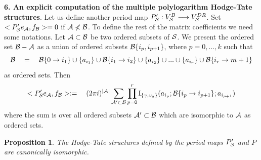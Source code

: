 \documentclass[10pt]{article}
\newtheorem{proposition}[theorem]{Proposition}
\begin{document}
{\bf 6. An explicit computation of the multiple polylogarithm  Hodge-Tate structures}. 
Let us define another  period map $P_{\cal S}': V_{{\cal S}}^B \longrightarrow 
V_{{\cal S}}^{DR}$. Set 
$<{P}'_{\cal S}e_{\cal A}, f_{\cal B}> =0$ if ${\cal A} \not < {\cal B}$. 
To define the rest of the matrix coefficients we need some notations. 
Let $ {\cal A} \subset {\cal B}$ be two ordered subsets of ${\cal S}$. 
We present the ordered set ${\cal B}- {\cal A}$ as a union of ordered subsets 
${\cal B}\{i_p, i_{p+1}\}$, where $p=0, ..., k$ such  that  
$$
{\cal B} \quad = \quad {\cal B}\{0  \to  i_{1}\}\cup  \{a_{i_1}\} \cup {\cal B}\{i_1\to  i_{2}\} \cup 
\{a_{i_2}\} \cup ... \cup \{a_{i_r}\} \cup {\cal B}\{i_{r} \to  m+1\} 
$$
as ordered sets.  Then   
\begin{equation} \label{1.5.00.1}
<P'_{\cal S}e_{\cal A}, f_{\cal B}>:= \quad (2\pi i)^{|{\cal A}|} 
\sum_{{\cal A}' \subset {\cal B}} \prod_{p=0}^r 
{\rm I}_{\{\gamma, v_a\}}(a_{i_p}; {\cal B}\{i_p \to i_{p+1}\}; a_{i_{p+1}})
\end{equation}
where the sum is over all ordered subsets  ${\cal A}' \subset {\cal B}$ which are 
isomorphic to ${\cal A}$ as ordered sets. 

\begin{proposition} \label{3.1.01.1} 
The Hodge-Tate structures defined by the 
period maps  $P_{\cal S}'$ and $P$ are canonically isomorphic.   
\end{proposition}
\end{document}

